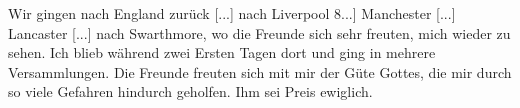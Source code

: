 Wir gingen nach
England zurück [...] nach Liverpool 8...] 
Manchester [...] Lancaster 
[...] nach Swarthmore, wo die Freunde 
sich sehr freuten,
mich wieder zu sehen. Ich blieb während zwei Ersten Tagen
dort und ging in mehrere Versammlungen. Die Freunde freuten
sich mit mir der Güte Gottes, die mir durch so viele Gefahren
hindurch geholfen. Ihm sei Preis ewiglich.
